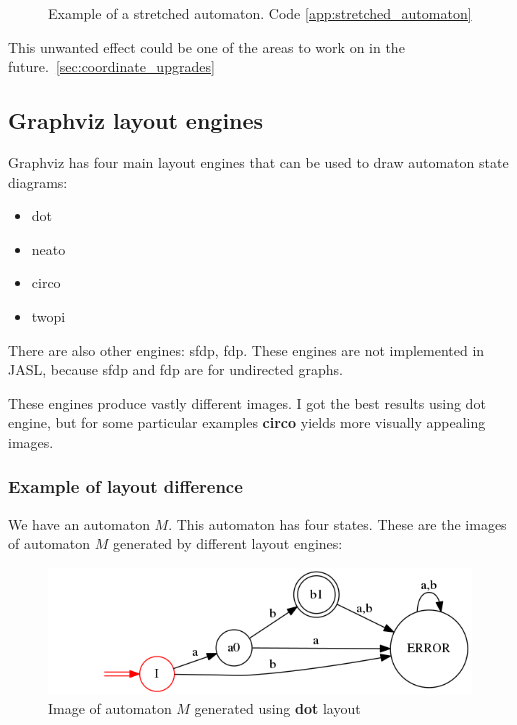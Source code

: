 \documentclass{ctuthesis}
\begin{document}
\begin{figure}[H]
\caption{Example of a stretched automaton. Code \ref{app:stretched_automaton}}
\label{fig:stretched_automaton}
\end{figure}

This unwanted effect could be one of the areas to work on in the future.~\ref{sec:coordinate_upgrades}

\subsection{Graphviz layout engines}
Graphviz has four main layout engines that can be used to draw automaton state diagrams:
\begin{itemize}
	\item dot
	\item neato
	\item circo
	\item twopi
\end{itemize}

There are also other engines: sfdp, fdp. These engines are not implemented in JASL, because sfdp and fdp are for undirected graphs.

These engines produce vastly different images. I got the best results using dot engine, but for some particular examples \textbf{circo} yields more visually appealing images.
 
\subsubsection{Example of layout difference}
We have an automaton $M$. This automaton has four states. These are the images of automaton $M$ generated by different layout engines:

\begin{figure}[H]
\includegraphics[width=0.8\linewidth]{figures/layouts_dot.png}
\caption{Image of automaton $M$ generated using \textbf{dot} layout}
\label{fig:layout_diff_dot}
\end{figure}
\end{document}
